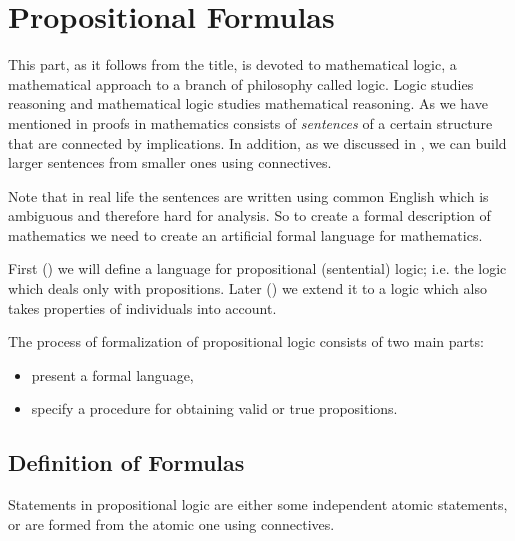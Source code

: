 \chapter{Propositional Formulas}
\label{chapter:propositional-formulas}


This part, as it follows from the title, is devoted to mathematical logic,
a mathematical approach to a branch of philosophy called logic. Logic studies
reasoning and mathematical logic studies mathematical reasoning. As we have
mentioned in  proofs in mathematics consists of
\emph{sentences} of a certain structure that are connected by implications.
In addition,  as we discussed in , we can build larger
sentences from smaller ones using connectives.

Note that in real life the sentences are written using common English which is
ambiguous and therefore hard for analysis.
So to create a formal description of mathematics we need to create an
artificial formal language for mathematics.

First
() 
we will define a language for propositional (sentential) logic; i.e. the logic
which deals only with propositions. Later () we
extend it to a logic which also takes properties of individuals into account.

The process of formalization of propositional logic consists of two main parts:
\begin{itemize}
  \item present a formal language,
  \item specify a procedure for obtaining valid or true propositions.
\end{itemize}

\section{Definition of Formulas}

Statements in  propositional logic are either some independent atomic
statements, or are formed from the atomic one using connectives.

